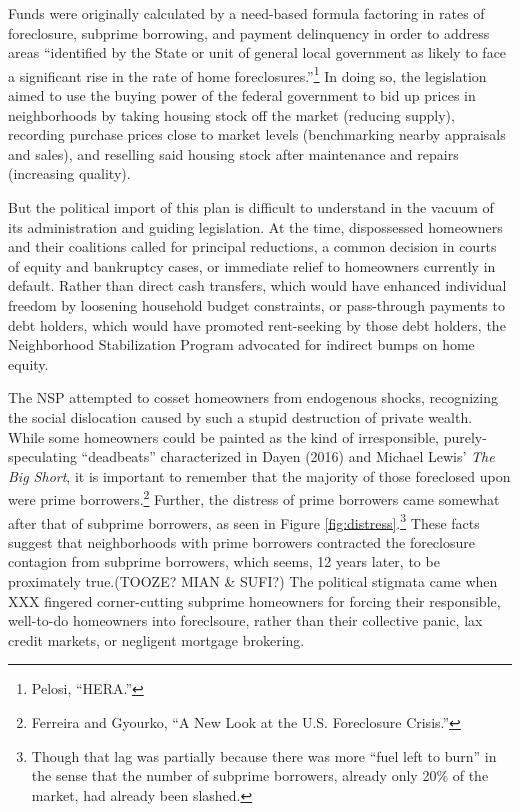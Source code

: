 \documentclass[
]{article}
\begin{document}
Funds were originally calculated by a need-based formula factoring in rates of foreclosure, subprime borrowing, and payment delinquency in order to address areas ``identified by the State or unit of general local government as likely to face a significant rise in the rate of home foreclosures.''\footnote{Pelosi, ``HERA.''}
In doing so, the legislation aimed to use the buying power of the federal government to bid up prices in neighborhoods by taking housing stock off the market (reducing supply), recording purchase prices close to market levels (benchmarking nearby appraisals and sales), and reselling said housing stock after maintenance and repairs (increasing quality).

But the political import of this plan is difficult to understand in the vacuum of its administration and guiding legislation.
At the time, dispossessed homeowners and their coalitions called for principal reductions, a common decision in courts of equity and bankruptcy cases, or immediate relief to homeowners currently in default.
Rather than direct cash transfers, which would have enhanced individual freedom by loosening household budget constraints, or pass-through payments to debt holders, which would have promoted rent-seeking by those debt holders, the Neighborhood Stabilization Program advocated for indirect bumps on home equity.

The NSP attempted to cosset homeowners from endogenous shocks, recognizing the social dislocation caused by such a stupid destruction of private wealth.
While some homeowners could be painted as the kind of irresponsible, purely-speculating ``deadbeats'' characterized in Dayen (2016) and Michael Lewis' \emph{The Big Short}, it is important to remember that the majority of those foreclosed upon were prime borrowers.\footnote{Ferreira and Gyourko, ``A New Look at the U.S. Foreclosure Crisis.''}
Further, the distress of prime borrowers came somewhat after that of subprime borrowers, as seen in Figure \ref{fig:distress}.\footnote{Though that lag was partially because there was more ``fuel left to burn'' in the sense that the number of subprime borrowers, already only 20\% of the market, had already been slashed.}
These facts suggest that neighborhoods with prime borrowers contracted the foreclosure contagion from subprime borrowers, which seems, 12 years later, to be proximately true.(TOOZE? MIAN \& SUFI?)
The political stigmata came when XXX fingered corner-cutting subprime homeowners for forcing their responsible, well-to-do homeowners into foreclsoure, rather than their collective panic, lax credit markets, or negligent mortgage brokering.
\end{document}
